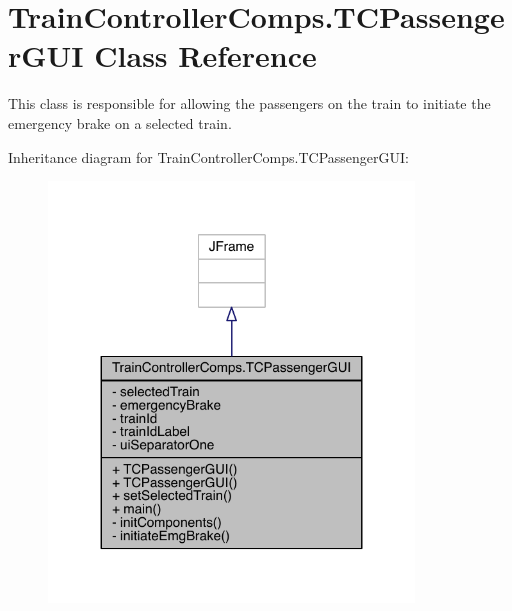 \hypertarget{classTrainControllerComps_1_1TCPassengerGUI}{}\section{Train\+Controller\+Comps.\+T\+C\+Passenger\+G\+UI Class Reference}
\label{classTrainControllerComps_1_1TCPassengerGUI}


This class is responsible for allowing the passengers on the train to initiate the emergency brake on a selected train.  




Inheritance diagram for Train\+Controller\+Comps.\+T\+C\+Passenger\+G\+UI\+:
\nopagebreak
\begin{figure}[H]
\begin{center}
\leavevmode
\includegraphics[width=275pt]{classTrainControllerComps_1_1TCPassengerGUI__inherit__graph}
\end{center}
\end{figure}


